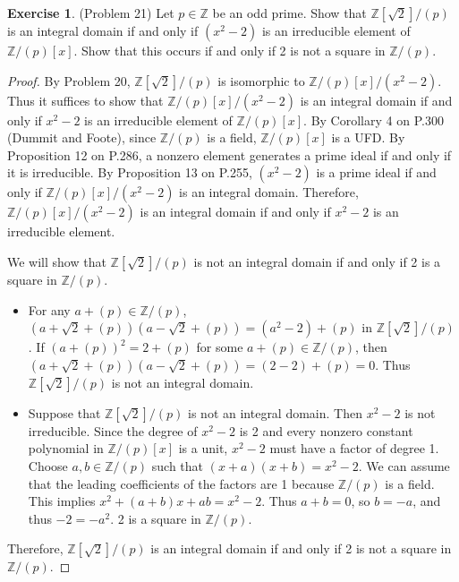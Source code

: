 \documentclass[12pt, psamsfonts]{amsart}
\theoremstyle{definition}
\newtheorem*{exer}{Exercise}
\theoremstyle{remark}
\numberwithin{equation}{section}
\begin{document}
\begin{exer}{(Problem 21)}
  Let $p \in \mathbb{Z}$ be an odd prime.
  Show that $\mathbb{Z}[\sqrt{2}]/(p)$ is an integral domain if and only if $(x^2 - 2)$ is an irreducible element of $\mathbb{Z}/(p)[x]$.
  Show that this occurs if and only if 2 is not a square in $\mathbb{Z}/(p)$.
\end{exer}

\begin{proof}
  By Problem 20, $\mathbb{Z}[\sqrt{2}]/(p)$ is isomorphic to $\mathbb{Z}/(p)[x]/(x^2 - 2)$.
  Thus it suffices to show that $\mathbb{Z}/(p)[x]/(x^2 - 2)$ is an integral domain if and only if $x^2 - 2$ is an irreducible element of $\mathbb{Z}/(p)[x]$.
  By Corollary 4 on P.300 (Dummit and Foote), since $\mathbb{Z}/(p)$ is a field, $\mathbb{Z}/(p)[x]$ is a UFD.
  By Proposition 12 on P.286, a nonzero element generates a prime ideal if and only if it is irreducible.
  By Proposition 13 on P.255, $(x^2 - 2)$ is a prime ideal if and only if $\mathbb{Z}/(p)[x]/(x^2 - 2)$ is an integral domain.
  Therefore, $\mathbb{Z}/(p)[x]/(x^2 - 2)$ is an integral domain if and only if $x^2 - 2$ is an irreducible element.

  We will show that $\mathbb{Z}[\sqrt{2}]/(p)$ is not an integral domain if and only if 2 is a square in $\mathbb{Z}/(p)$.
  \begin{itemize}
    \item
      For any $a + (p) \in \mathbb{Z}/(p)$, $(a + \sqrt{2} + (p))(a - \sqrt{2} + (p)) = (a^2 - 2) + (p)$ in $\mathbb{Z}[\sqrt{2}]/(p)$.
      If $(a + (p))^2 = 2 + (p)$ for some $a + (p) \in \mathbb{Z}/(p)$, then $(a + \sqrt{2} + (p))(a - \sqrt{2} + (p)) = (2 - 2) + (p) = 0$.
      Thus $\mathbb{Z}[\sqrt{2}]/(p)$ is not an integral domain.
    \item
      Suppose that $\mathbb{Z}[\sqrt{2}]/(p)$ is not an integral domain.
      Then $x^2 - 2$ is not irreducible.
      Since the degree of $x^2 - 2$ is 2 and every nonzero constant polynomial in $\mathbb{Z}/(p)[x]$ is a unit, $x^2 - 2$ must have a factor of degree 1.
      Choose $a, b \in \mathbb{Z}/(p)$ such that $(x + a)(x + b) = x^2 - 2$.
      We can assume that the leading coefficients of the factors are 1 because $\mathbb{Z}/(p)$ is a field.
      This implies $x^2 + (a + b)x + ab = x^2 - 2$.
      Thus $a + b = 0$, so $b = -a$, and thus $-2 = -a^2$.
      2 is a square in $\mathbb{Z}/(p)$.
  \end{itemize}

  Therefore, $\mathbb{Z}[\sqrt{2}]/(p)$ is an integral domain if and only if 2 is not a square in $\mathbb{Z}/(p)$.
\end{proof}
\end{document}

